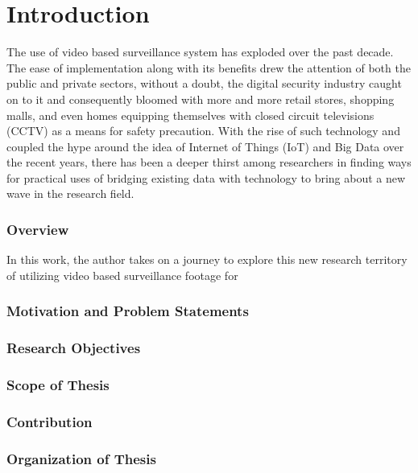 \chapter{Introduction}
The use of video based surveillance system has exploded over the past decade. The ease of implementation along with its benefits drew the attention of both the public and private sectors, without a doubt, the digital security industry caught on to it and consequently bloomed with more and more retail stores, shopping malls, and even homes equipping themselves with closed circuit televisions (CCTV) as a means for safety precaution. With the rise of such technology and coupled the hype around the idea of Internet of Things (IoT) and Big Data over the recent years, there has been a deeper thirst among researchers in finding ways for practical uses of bridging existing data with technology to bring about a new wave in the research field.

\subsection{Overview}

In this work, the author takes on a journey to explore this new research territory of utilizing video based surveillance footage for 


\subsection{Motivation and Problem Statements}

\subsection{Research Objectives}




\subsection{Scope of Thesis}
\label{subsec:scope}



\subsection{Contribution}

\subsection{Organization of Thesis}